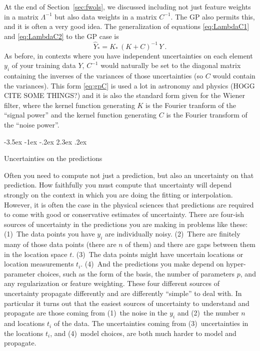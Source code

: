 \documentclass[12pt,letterpaper]{article}
\makeatletter
\renewcommand\section{\@startsection {section}{1}{\z@}%
  {-3.5ex \@plus -1ex \@minus -.2ex}%
  {2.3ex \@plus.2ex}%
  {\raggedright\normalfont\Large\bfseries}}
\newcommand{\sectionname}{Section}
\makeatother
\begin{document}
At the end of \sectionname~\ref{sec:fwols}, we discussed including not just feature weights in a matrix $\Lambda^{-1}$ but also data weights in a matrix $C^{-1}$. The GP also permits this, and it is often a very good idea. The generalization of equations \eqref{eq:LambdaC1} and \eqref{eq:LambdaC2} to the GP case is 
\begin{equation}\label{eq:gpC}
    \hat{Y}_\ast = K_\ast\,(K + C)^{-1}\,Y
    ~.
\end{equation}
As before, in contexts where you have independent uncertainties on each element $y_i$ of your training data $Y$, $C^{-1}$ would naturally be set to the diagonal matrix containing the inverses of the variances of those uncertainties (so $C$ would contain the variances).
This form \eqref{eq:gpC} is used a lot in astronomy and physics (HOGG CITE SOME THINGS?) and it is also the standard form given for the Wiener filter, where the kernel function generating $K$ is the Fourier tranform of the ``signal power'' and the kernel function generating $C$ is the Fourier transform of the ``noise power''.

\section{Uncertainties on the predictions}\label{sec:uncertainty}

Often you need to compute not just a prediction, but also an uncertainty on that prediction.
How faithfully you must compute that uncertainty will depend strongly on the context in which you are doing the fitting or interpolation.
However, it is often the case in the physical sciences that predictions are required to come with good or conservative estimates of uncertainty.
There are four-ish sources of uncertainty in the predictions you are making in problems like these:
(1)~The data points you have $y_i$ are individually noisy.
(2)~There are finitely many of those data points (there are $n$ of them) and there are gaps between them in the location space $t$.
(3)~The data points might have uncertain locations or location measurements $t_i$.
(4)~And the predictions you make depend on hyper-parameter choices, such as the form of the basis, the number of parameters $p$, and any regularization or feature weighting.
These four different sources of uncertainty propagate differently and are differently ``simple'' to deal with.
In particular it turns out that the easiest sources of uncertainty to understand and propagate are those coming from (1)~the noise in the $y_i$ and (2)~the number $n$ and locations $t_i$ of the data.
The uncertainties coming from (3)~uncertainties in the locations $t_i$, and (4)~model choices, are both much harder to model and propagate.
\end{document}
